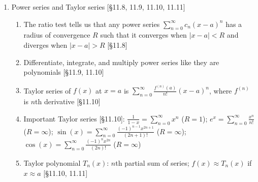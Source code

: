 \documentclass[11pt]{article}
\begin{document}
\begin{enumerate}
\item Power series and Taylor series [\S11.8, 11.9, 11.10, 11.11]
\begin{enumerate}
\item The ratio test tells us that any power series $\sum_{n=0}^{\infty} c_n (x-a)^n$ has a radius of convergence $R$ such that it converges when $|x-a|<R$ and diverges when $|x-a|>R$ [\S11.8]
\item Differentiate, integrate, and multiply power series like they are polynomials [\S11.9, 11.10]
\item Taylor series of $f(x)$ at $x=a$ is $\sum_{n=0}^{\infty} \frac{f^{(n)}(a)}{n!} (x-a)^n$, where $f^{(n)}$ is $n$th derivative [\S11.10]
\item Important Taylor series [\S11.10]: $\frac{1}{1-x} = \sum_{n=0}^{\infty} x^n$ ($R=1$); \; $e^x = \sum_{n=0}^{\infty} \frac{x^n}{n!}$ ($R=\infty$); \; $\sin(x) = \sum_{n=0}^{\infty} \frac{(-1)^{n-1}x^{2n+1}}{(2n+1)!}$ ($R=\infty$); \; $\cos(x)=\sum_{n=0}^{\infty}\frac{(-1)^{n}x^{2n}}{(2n)!}$ ($R=\infty$)
\item Taylor polynomial $T_n(x)$: $n$th partial sum of series; $f(x) \approx T_n(x)$ if $x\approx a$ [\S11.10, 11.11]
\end{enumerate}

\end{enumerate}
\end{document}
